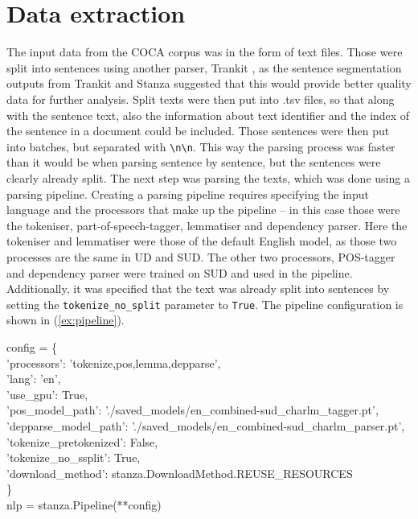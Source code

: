 \section{Data extraction}

The input data from the COCA corpus was in the form of text files. Those were split into sentences using another parser, Trankit \citep{nguyen2021trankit}, as the sentence segmentation outputs from Trankit and Stanza suggested that this would provide better quality data for further analysis. Split texts were then put into .tsv files, so that along with the sentence text, also the information about text identifier and the index of the sentence in a document could be included. Those sentences were then put into batches, but separated with \texttt{\textbackslash n\textbackslash n}. This way the parsing process was faster than it would be when parsing sentence by sentence, but the sentences were clearly already split. The next step was parsing the texts, which was done using a parsing pipeline. Creating a parsing pipeline requires specifying the input language and the processors that make up the pipeline -- in this case those were the tokeniser, part-of-speech-tagger, lemmatiser and dependency parser. Here the tokeniser and lemmatiser were those of the default English model, as those two processes are the same in UD and SUD. The other two processors, POS-tagger and dependency parser were trained on SUD and used in the pipeline. Additionally, it was specified that the text was already split into sentences by setting the \texttt{tokenize\_no\_split} parameter to \texttt{True}. The pipeline configuration is shown in (\ref{ex:pipeline}).

\begin{exe}
\ex\label{ex:pipeline}
\ttfamily\raggedright\small
config = \{\\\hspace{.5cm}
        'processors': 'tokenize,pos,lemma,depparse',\\\hspace{.5cm}
        'lang': 'en',\\\hspace{.5cm}
        'use\_gpu': True,\\\hspace{.5cm}
        'pos\_model\_path': './saved\_models/en\_combined-sud\_charlm\_tagger.pt',\\\hspace{.5cm}
        'depparse\_model\_path': './saved\_models/en\_combined-sud\_charlm\_parser.pt',\\\hspace{.5cm}
        'tokenize\_pretokenized': False,\\\hspace{.5cm}
        'tokenize\_no\_ssplit': True,\\\hspace{.5cm}
        'download\_method': stanza.DownloadMethod.REUSE\_RESOURCES\\\hspace{.5cm}
\}\\
nlp = stanza.Pipeline(**config)
\end{exe}

